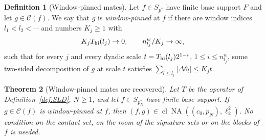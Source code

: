 \documentclass[10pt]{amsart}
\newtheorem{theorem}{Theorem}[section]
\theoremstyle{definition}
\newtheorem{definition}[theorem]{Definition}
\theoremstyle{remark}
\newcommand{\NA}{\operatorname{NA}}
\newcommand{\Cset}{\mathcal C}
\newcommand{\cl}{\operatorname{cl}}
\begin{document}
\begin{definition}[Window-pinned mates]\label{def:windowpinned}
Let $f\in S_{p^*}$ have finite base support $F$ and let $g\in\Cset(f)$.  We
say that $g$ is \emph{window-pinned} at $f$ if there are window indices
$l_1<l_2<\cdots$ and numbers $K_j\ge1$ with
\[
 K_jT_{\rm hi}(l_j)\to0,\qquad n^w_{l_j}/K_j\to\infty,
\]
such that for every $j$ and every dyadic scale $t=T_{\rm hi}(l_j)2^{1-i}$,
$1\le i\le n^w_{l_j}$, some two-sided decomposition of $g$ at scale $t$
satisfies $\sum_{l\le l_j}|\Delta\theta_l|\le K_jt$.
\end{definition}

\begin{theorem}[Window-pinned mates are recovered]\label{thm:Bstar}
Let $T$ be the operator of Definition~\ref{def:SLD}, $N\ge1$, and let
$f\in S_{p_N^*}$ have finite base support.  If $g\in\Cset(f)$ is
window-pinned at $f$, then $(f,g)\in\cl\NA((c_0,p_N),\ell_2^2)$.  No
condition on the contact set, on the room of the signature sets or on
the blocks of $f$ is needed.
\end{theorem}
\end{document}

